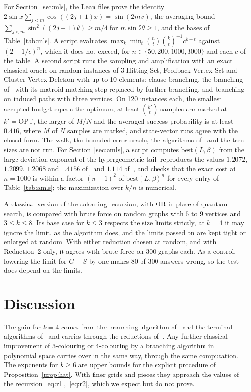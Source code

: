 \documentclass[11pt]{article}
\theoremstyle{remark}
\begin{document}
For Section~\ref{sec:mls}, the Lean files prove the identity $2\sin x \sum_{j<m}\cos((2j+1)x) = \sin(2mx)$, the averaging bound $\sum_{j<m}\sin^2((2j+1)\theta) \ge m/4$ for $m\sin 2\theta \ge 1$, and the bases of Table~\ref{tab:mls}. A script evaluates $\max_{k}\min_t \binom{n}{t}\binom{k}{t}^{-1}c^{k-t}$ against $(2-1/c)^n$, which it does not exceed, for $n \in \{50, 200, 1000, 3000\}$ and each $c$ of the table. A second script runs the sampling and amplification with an exact classical oracle on random instances of 3-Hitting Set, Feedback Vertex Set and Cluster Vertex Deletion with up to 10 elements: clause branching, the branching of~\cite{IK19} with its matroid matching step replaced by further branching, and branching on induced paths with three vertices. On 120 instances each, the smallest accepted budget equals the optimum, at least $\binom{k'}{t}$ samples are marked at $k' = \mathrm{OPT}$, the larger of $M/N$ and the averaged success probability is at least $0.416$, where $M$ of $N$ samples are marked, and state-vector runs agree with the closed form. The walk, the bounded-error oracle, the algorithms of~\cite{Tsu19,KLL13,IWY16,SZ15,Cao15} and the tree sizes are not run. For Section~\ref{sec:amls}, a script computes $\mathrm{best}(L,\beta)$ from the large-deviation exponent of the hypergeometric tail, reproduces the values $1.2072$, $1.2099$, $1.2068$ and $1.4156$ of~\cite{EKMNS24} and $1.114$ of~\cite{EKMNS22}, and checks that the exact cost at $n = 1000$ is within a factor $(n+1)^2$ of $\mathrm{best}(L,\beta)^n$ for every entry of Table~\ref{tab:amls}; the maximization over $k/n$ is numerical.

A classical version of the colouring recursion, with OR in place of quantum search, is compared with brute force on random graphs with 5 to 9 vertices and $3 \le k \le 8$. Its base case for $k \le 3$ respects the size limits strictly, at $k = 4$ it may ignore the limit, as the algorithm does, and the limits passed on are kept tight or enlarged at random. With either reduction chosen at random, and with Reduction~2 only, it agrees with brute force on 300 graphs each. As a control, lowering the limit for $G - S$ by one makes 80 of 300 answers wrong, so the test does depend on the limits.

\section{Discussion}

The gain for $k = 4$ comes from the branching algorithm of~\cite{WGJ24} and the terminal algorithms of~\cite{YS26} and carries through the reductions of~\cite{Bys04,SM22}. Any further classical improvement of 3-colouring or 4-colouring by a branching algorithm in polynomial space carries over in the same way, through the same computation. The exponents for $k \ge 6$ are upper bounds for the explicit procedure of Proposition~\ref{prop:hat}. With finer grids and pieces they approach the values of the recursion~\eqref{eq:r1},~\eqref{eq:r2}, which we expect but do not prove.
\end{document}
